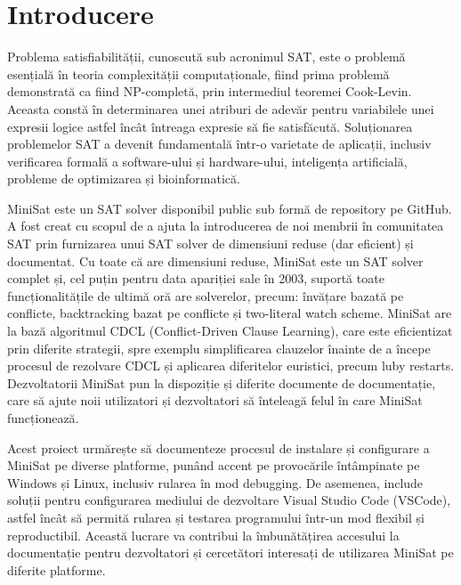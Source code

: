 \documentclass{llncs}
\begin{document}
\newpage

\section{Introducere}

Problema satisfiabilității, cunoscută sub acronimul SAT, este o problemă esențială în teoria complexității computaționale, fiind prima problemă demonstrată ca fiind NP-completă, prin intermediul teoremei Cook-Levin\cite{ref_Cook_Levin_Theorem}. Aceasta constă în determinarea unei atriburi de adevăr pentru variabilele unei expresii logice astfel încât întreaga expresie să fie satisfăcută. Soluționarea problemelor SAT a devenit fundamentală într-o varietate de aplicații, inclusiv verificarea formală a software-ului și hardware-ului, inteligența artificială, probleme de optimizarea și bioinformatică.

MiniSat este un SAT solver disponibil public sub formă de repository pe GitHub\cite{ref_MiniSat_Original_Repository}. A fost creat cu scopul de a ajuta la introducerea de noi membrii în comunitatea SAT prin furnizarea unui SAT solver de dimensiuni reduse (dar eficient) și documentat. Cu toate că are dimensiuni reduse, MiniSat este un SAT solver complet și, cel puțin pentru data apariției sale în 2003, suportă toate funcționalitățile de ultimă oră are solverelor, precum: învățare bazată pe conflicte, backtracking bazat pe conflicte și two-literal watch scheme\cite{ref_MiniSat_home_page}. MiniSat are la bază algoritmul CDCL (Conflict-Driven Clause Learning), care este eficientizat prin diferite strategii, spre exemplu simplificarea clauzelor înainte de a începe procesul de rezolvare CDCL și aplicarea diferitelor euristici, precum luby restarts\cite{ref_luby_restart}. Dezvoltatorii MiniSat pun la dispoziție și diferite documente de documentație, care să ajute noii utilizatori și dezvoltatori să înteleagă felul în care MiniSat funcționează\cite{ref_MiniSat_docs}.

Acest proiect urmărește să documenteze procesul de instalare și configurare a MiniSat pe diverse platforme, punând accent pe provocările întâmpinate pe Windows și Linux, inclusiv rularea în mod debugging. De asemenea, include soluții pentru configurarea mediului de dezvoltare Visual Studio Code (VSCode), astfel încât să permită rularea și testarea programului într-un mod flexibil și reproductibil. Această lucrare va contribui la îmbunătățirea accesului la documentație pentru dezvoltatori și cercetători interesați de utilizarea MiniSat pe diferite platforme.
\end{document}
